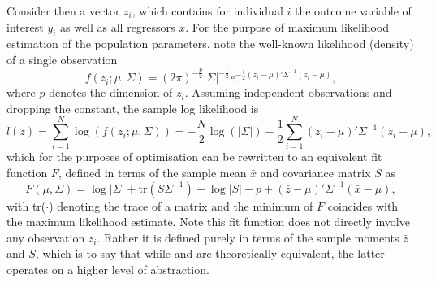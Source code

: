 Consider then a vector $z_i$, which contains for individual $i$ the outcome variable of interest $y_i$ as well as
all regressors $x$.
For the purpose of maximum likelihood estimation of the population parameters, note the well-known
likelihood (density) of a single observation
\begin{equation}
    f(z_i; \mu, \Sigma) = (2\pi)^{-\frac{p}{2}} |\Sigma|^{-\frac{1}{2}} e^{-\frac{1}{2}(z_i - \mu)' \Sigma^{-1}(z_i - \mu)},
\end{equation}
where $p$ denotes the dimension of $z_i$.
Assuming independent observations and dropping the constant, the sample log likelihood is
\begin{equation}
    \label{eq:methods:sample_likelihood}
    l(z) = \sum_{i=1}^N \log(f(z_i; \mu, \Sigma))
    = -\frac{N}{2} \log(|\Sigma|) -\frac{1}{2} \sum_{i=1}^N (z_i - \mu)' \Sigma^{-1} (z_i - \mu),
\end{equation}
which for the purposes of optimisation can be rewritten to an equivalent fit function $F$, defined in terms of
the sample mean $\bar{x}$ and covariance matrix $S$ \cite{preacher2016ml} as
\begin{equation}
    \label{eq:methods:objective_function}
    F(\mu, \Sigma) = \log|\Sigma| + \text{tr}(S \Sigma^{-1}) - \log|S| - p + (\bar{z} - \mu)' \Sigma^{-1} (\bar{x} - \mu),
\end{equation}
with tr($\cdot$) denoting the trace of a matrix and the minimum of $F$ coincides with the maximum likelihood estimate.
Note this fit function does not directly involve any observation $z_i$. Rather it is defined purely in terms of the
sample moments $\bar{z}$ and $S$, which is to say that while  and
 are theoretically equivalent, the latter operates on a higher level of abstraction.

